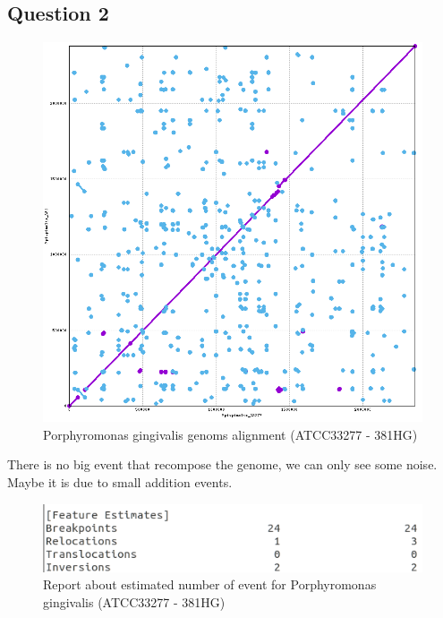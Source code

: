 \documentclass[]{article}
\theoremstyle{definition}
\begin{document}
\subsection{Question 2}

\begin{figure}[H]
	\centering
	\includegraphics*[scale=0.4]{image/Pgingivalis_381.png}
	\caption{ Porphyromonas gingivalis genoms alignment (ATCC33277 - 381HG) }
\end{figure}

There is no big event that recompose the genome, we can only see some noise. Maybe it is due to small addition events.

\begin{figure}[H]
	\centering
	\includegraphics*[scale=0.7]{image/reportq2381.png}
	\caption{ Report about estimated number of event for Porphyromonas gingivalis (ATCC33277 - 381HG) }
\end{figure}
\end{document}
